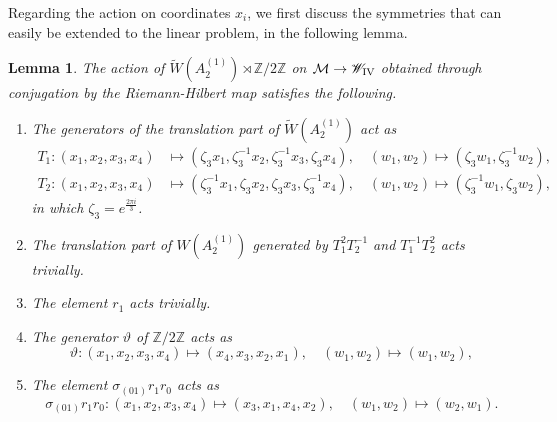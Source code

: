 \documentclass[a4paper,reqno]{amsart}
\numberwithin{equation}{section}
\newcommand{\Z}{\mathbb{Z}}
\newtheorem{lemma}[theorem]{Lemma}
\numberwithin{equation}{section}
\begin{document}
Regarding the action on coordinates $x_i$, we first discuss the symmetries that can easily be extended to the linear problem, in the following lemma.
\begin{lemma} \label{lem:PIVsymmetriesunderRHdirect}
The action of $\widetilde{W}(A_2^{(1)})\rtimes \Z/2\Z$ on $\mathcal{M}\to \mathscr{W}_{\rm{IV}}$ obtained through conjugation by the Riemann-Hilbert map satisfies the following.
\begin{enumerate}
    \item The generators of the translation part of $\widetilde{W}(A_2^{(1)})$ act as
    \begin{align*}
        T_1 : (x_1,x_2,x_3,x_4)&\mapsto \left( \zeta_3 x_1, \zeta_3^{-1} x_2, \zeta_3^{-1} x_3, \zeta_3 x_4\right), \quad \left(w_1,w_2\right)\mapsto \left( \zeta_3 w_1, \zeta_3^{-1} w_2\right),\\
        T_2 : (x_1,x_2,x_3,x_4)&\mapsto \left( \zeta_3^{-1}x_1, \zeta_3 x_2,\zeta_3 x_3,\zeta_3^{-1} x_4\right), \quad \left(w_1,w_2\right)\mapsto \left( \zeta_3^{-1} w_1, \zeta_3 w_2\right),
    \end{align*}
    in which $\zeta_3=e^{\frac{2\pi i}{3}}$.
    \item The translation part of $W(A_2^{(1)})$ generated by $T_1^2T_2^{-1}$ and $T_1^{-1}T_2^{2}$ acts trivially.
    \item The element $r_1$ acts trivially.
    \item The generator $\vartheta$ of $\Z/2\Z$ acts as 
    \begin{equation*}
        \vartheta : (x_1,x_2,x_3,x_4)\mapsto \left( x_4,x_3,x_2,x_1\right), \quad \left(w_1,w_2\right)\mapsto \left( w_1, w_2\right),
    \end{equation*}
    \item The element $\sigma_{(01)}r_1r_0$ acts as  
    \begin{equation*}
        \sigma_{(01)}r_1r_0 : (x_1,x_2,x_3,x_4)\mapsto \left( x_3,x_1,x_4,x_2\right), \quad \left(w_1,w_2\right)\mapsto \left( w_2, w_1\right).
    \end{equation*}
\end{enumerate}
\end{lemma}
\end{document}
